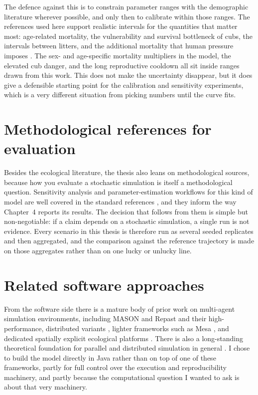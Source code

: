 The defence against this is to constrain parameter ranges with the demographic literature wherever possible, and only then to calibrate within those ranges. The references used here support realistic intervals for the quantities that matter most: age-related mortality, the vulnerability and survival bottleneck of cubs, the intervals between litters, and the additional mortality that human pressure imposes \cite{Schwartz2003,Saether1998,McLellan1989,Bischof2009}. The sex- and age-specific mortality multipliers in the model, the elevated cub danger, and the long reproductive cooldown all sit inside ranges drawn from this work. This does not make the uncertainty disappear, but it does give a defensible starting point for the calibration and sensitivity experiments, which is a very different situation from picking numbers until the curve fits.

\section{Methodological references for evaluation}

Besides the ecological literature, the thesis also leans on methodological sources, because how you evaluate a stochastic simulation is itself a methodological question. Sensitivity analysis and parameter-estimation workflows for this kind of model are well covered in the standard references \cite{Saltelli2008,Thiele2014}, and they inform the way Chapter~4 reports its results. The decision that follows from them is simple but non-negotiable: if a claim depends on a stochastic simulation, a single run is not evidence. Every scenario in this thesis is therefore run as several seeded replicates and then aggregated, and the comparison against the reference trajectory is made on those aggregates rather than on one lucky or unlucky line.

\section{Related software approaches}

From the software side there is a mature body of prior work on multi-agent simulation environments, including MASON and Repast and their high-performance, distributed variants \cite{Luke2005,CollierNorth2013,North2013}, lighter frameworks such as Mesa \cite{Masad2015}, and dedicated spatially explicit ecological platforms \cite{Bocedi2014}. There is also a long-standing theoretical foundation for parallel and distributed simulation in general \cite{Fujimoto2000}. I chose to build the model directly in Java rather than on top of one of these frameworks, partly for full control over the execution and reproducibility machinery, and partly because the computational question I wanted to ask is about that very machinery.

